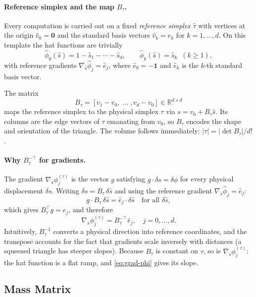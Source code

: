 \documentclass[11pt]{article}
\newcommand{\R}{\mathbb{R}}
\begin{document}
\paragraph{Reference simplex and the map $B_\tau$.}
Every computation is carried out on a fixed \emph{reference simplex}
$\hat\tau$ with vertices at the origin $\hat{v}_0=\mathbf{0}$ and the
standard basis vectors $\hat{v}_k = e_k$ for $k=1,\ldots,d$.  On this
template the hat functions are trivially
\[
  \hat\phi_0(\hat s) = 1 - \hat s_1 - \cdots - \hat s_d, \qquad
  \hat\phi_k(\hat s) = \hat s_k \;\;(k\ge 1),
\]
with reference gradients $\nabla_{\hat s}\hat\phi_j = \hat{e}_j$, where
$\hat{e}_0 = -\mathbf{1}$ and $\hat{e}_k$ is the $k$-th standard basis
vector.

The matrix
\begin{equation}
  B_\tau = [v_1 - v_0, \;\ldots\;, v_d - v_0] \in \R^{d\times d}
\end{equation}
maps the reference simplex to the physical simplex $\tau$ via
$s = v_0 + B_\tau\hat s$.  Its columns are the edge vectors of $\tau$
emanating from $v_0$, so $B_\tau$ encodes the shape and orientation of the
triangle.  The volume follows immediately: $|\tau| = |\det B_\tau|/d!$.

\paragraph{Why $B_\tau^{-\top}$ for gradients.}
The gradient $\nabla_s\phi_j^{(\tau)}$ is the vector $g$ satisfying
$g\cdot\delta s = \delta\phi$ for every physical displacement $\delta s$.
Writing $\delta s = B_\tau\,\delta\hat s$ and using the reference gradient
$\nabla_{\hat s}\hat\phi_j = \hat{e}_j$:
\[
  g \cdot B_\tau\,\delta\hat s
  = \hat{e}_j \cdot \delta\hat s
  \quad\text{for all }\delta\hat s,
\]
which gives $B_\tau^{\top}g = \hat{e}_j$, and therefore
\begin{equation}
  \nabla_s \phi_j^{(\tau)} = B_\tau^{-\top}\hat{e}_j, \quad j = 0, \ldots, d.
  \label{eq:grad-phi}
\end{equation}
Intuitively, $B_\tau^{-1}$ converts a physical direction into reference
coordinates, and the transpose accounts for the fact that gradients scale
inversely with distances (a squeezed triangle has steeper slopes).  Because
$B_\tau$ is constant on $\tau$, so is $\nabla_s\phi_j^{(\tau)}$: the hat
function is a flat ramp, and \eqref{eq:grad-phi} gives its slope.

\subsection{Mass Matrix}
\label{sec:mass}
\end{document}
